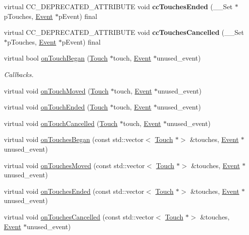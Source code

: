\begin{DoxyCompactItemize}
virtual C\+C\+\_\+\+D\+E\+P\+R\+E\+C\+A\+T\+E\+D\+\_\+\+A\+T\+T\+R\+I\+B\+U\+TE void {\bfseries cc\+Touches\+Ended} (\+\_\+\+\_\+\+Set $\ast$p\+Touches, \hyperlink{classEvent}{Event} $\ast$p\+Event) final
\item 
\mbox{\label{classLayer_af74425b0b9392ab8f90698a6cf2f12cb}} 
virtual C\+C\+\_\+\+D\+E\+P\+R\+E\+C\+A\+T\+E\+D\+\_\+\+A\+T\+T\+R\+I\+B\+U\+TE void {\bfseries cc\+Touches\+Cancelled} (\+\_\+\+\_\+\+Set $\ast$p\+Touches, \hyperlink{classEvent}{Event} $\ast$p\+Event) final
\item 
virtual bool \hyperlink{classLayer_abe632dc131bdeb3d603090d4d31db25c}{on\+Touch\+Began} (\hyperlink{classTouch}{Touch} $\ast$touch, \hyperlink{classEvent}{Event} $\ast$unused\+\_\+event)
\begin{DoxyCompactList}\small\item\em Callbacks. \end{DoxyCompactList}\item 
virtual void \hyperlink{classLayer_ad614a7a347f171cd6185e7aeef125047}{on\+Touch\+Moved} (\hyperlink{classTouch}{Touch} $\ast$touch, \hyperlink{classEvent}{Event} $\ast$unused\+\_\+event)
\item 
virtual void \hyperlink{classLayer_a9dbcca0eab3b0cd3cdc279615c604413}{on\+Touch\+Ended} (\hyperlink{classTouch}{Touch} $\ast$touch, \hyperlink{classEvent}{Event} $\ast$unused\+\_\+event)
\item 
virtual void \hyperlink{classLayer_a9254f82e75c109b81c392d415ecf7b3d}{on\+Touch\+Cancelled} (\hyperlink{classTouch}{Touch} $\ast$touch, \hyperlink{classEvent}{Event} $\ast$unused\+\_\+event)
\item 
virtual void \hyperlink{classLayer_a215f7865e3391ae605885af8b639277a}{on\+Touches\+Began} (const std\+::vector$<$ \hyperlink{classTouch}{Touch} $\ast$$>$ \&touches, \hyperlink{classEvent}{Event} $\ast$unused\+\_\+event)
\item 
virtual void \hyperlink{classLayer_af1c25a5eb91f619ca30b130c59f8ccbd}{on\+Touches\+Moved} (const std\+::vector$<$ \hyperlink{classTouch}{Touch} $\ast$$>$ \&touches, \hyperlink{classEvent}{Event} $\ast$unused\+\_\+event)
\item 
virtual void \hyperlink{classLayer_a25edcc53db05941565bcd2e09e8149aa}{on\+Touches\+Ended} (const std\+::vector$<$ \hyperlink{classTouch}{Touch} $\ast$$>$ \&touches, \hyperlink{classEvent}{Event} $\ast$unused\+\_\+event)
\item 
virtual void \hyperlink{classLayer_af5ebddb9ced172ccbd60b82330448b2f}{on\+Touches\+Cancelled} (const std\+::vector$<$ \hyperlink{classTouch}{Touch} $\ast$$>$ \&touches, \hyperlink{classEvent}{Event} $\ast$unused\+\_\+event)

\end{DoxyCompactItemize}
